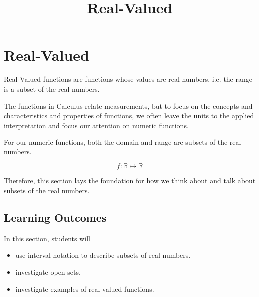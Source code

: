 \documentclass{ximera}
\title{Real-Valued}
\begin{document}
\begin{abstract}
\end{abstract}
\maketitle




\section*{Real-Valued}


Real-Valued functions are functions whose values are real numbers, i.e. the range is a subset of the real numbers. 


The functions in Calculus relate measurements, but to focus on the concepts and characteristics and properties of functions, we often leave the units to the applied interpretation and focus our attention on numeric functions. 


For our numeric functions, both the domain and range are subsets of the real numbers. 

\[
f : \mathbb{R} \mapsto \mathbb{R}
\]


Therefore, this section lays the foundation for how we think about and talk about subsets of the real numbers.










\subsection*{Learning Outcomes}





\begin{sectionOutcomes}
In this section, students will 

\begin{itemize}
\item use interval notation to describe subsets of real numbers.
\item investigate open sets.
\item investigate examples of real-valued functions.
\end{itemize}
\end{sectionOutcomes}
\end{document}
